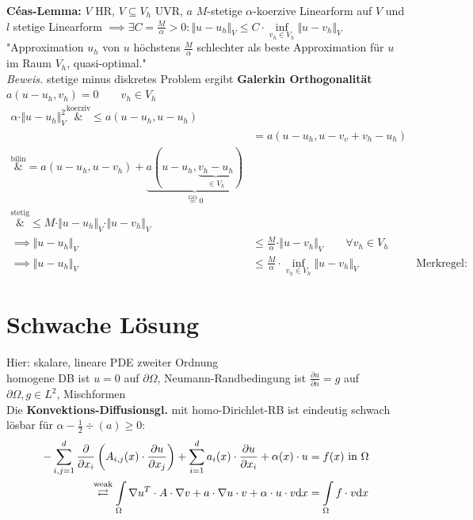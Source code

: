 \documentclass[12pt]{scrartcl}
\begin{document}
	\textbf{Céas-Lemma:} $V$ HR, $V\subseteq V_h$ UVR, $a$ $M$-stetige $\alpha$-koerzive Linearform auf $V$ und $l$ stetige Linearform $\implies\exists C=\frac{M}{\alpha}>0:\Vert u-u_h\Vert_V\leq C\cdot\inf\limits_{v_h\in V_h}\Vert u-v_h\Vert_V$
	"Approximation $u_h$ von $u$ höchstens $\frac{M}{\alpha}$ schlechter als beste Approximation für $u$ im Raum $V_h$, quasi-optimal."\\
	\textit{Beweis.} stetige minus diskretes Problem ergibt \textbf{Galerkin Orthogonalität} 
	$a(u-u_h,v_h)=0\qquad v_h\in V_h$
	\begin{align*}
		\alpha\cdot\Vert u-u_h\Vert^2_V
		\overset{\text{koerziv}}&\leq
		a(u-u_h,u-u_h)\\
		&=a(u-u_h,u-v_v+v_h- u_h)\\
		\overset{\text{bilin}}&=
		a(u-u_h,u-v_h)+\underbrace{a(u-u_h,\underbrace{v_h-u_h}_{\in V_h})}_{\overset{\text{GO}}=0}\\
		\overset{\text{stetig}}&{\leq}
		M\cdot\Vert u-u_h\Vert_V\cdot\Vert u-v_h\Vert_V\\
		\implies
		\Vert u-u_h\Vert_V&\leq\frac{M}{\alpha}\cdot\Vert u-v_h\Vert_V\qquad\forall v_h\in V_h\\
		\implies
		\Vert u-u_h\Vert_V&\leq \frac{M}{\alpha}\cdot\inf\limits_{v_h\in V_h}\Vert u-v_h\Vert_V 
		&\text{Merkregel: KOBSTI}
	\end{align*}
	
	\section{Schwache Lösung}
	
	Hier: skalare, lineare PDE zweiter Ordnung\\
	homogene DB ist $u=0$ auf $\partial\Omega$, Neumann-Randbedingung ist $\frac{\partial u}{\partial n}=g$ auf $\partial\Omega,g\in L^2$, Mischformen\\
	Die \textbf{Konvektions-Diffusionsgl.} mit homo-Dirichlet-RB ist eindeutig schwach lösbar für $\alpha-\frac{1}{2}\div(a)\geq0$:
	\begin{align*}
	-\sum\limits_{i,j=1}^d\frac{\partial}{\partial x_i}\left(A_{i,j}(x)\cdot\frac{\partial u}{\partial x_j}\right)+\sum\limits_{i=1}^d a_i(x)\cdot\frac{\partial u}{\partial x_i}+\alpha(x)\cdot u&=f(x)\text{ in }\Omega\\
	\overset{\text{weak}}{\rightleftarrows}
	\int\limits_\Omega\nabla u^T\cdot A\cdot\nabla v+a\cdot\nabla u\cdot v+\alpha\cdot u\cdot v\mathrm{d} x&=\int\limits_\Omega f\cdot v\mathrm{d} x
	\end{align*}
	
\end{document}
